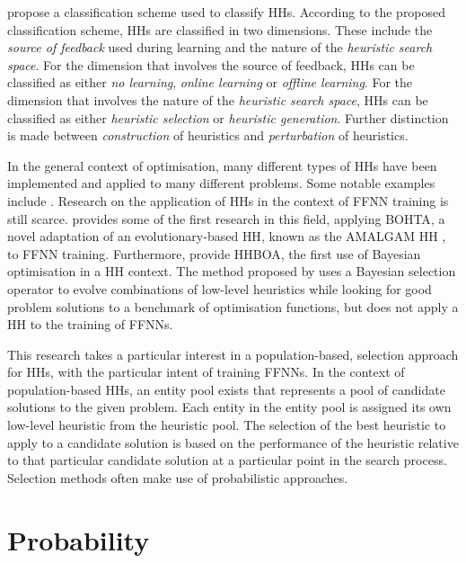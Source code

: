 \documentclass[preprint,review,12pt]{elsarticle}
\begin{document}
\citet{ref:burke:2010} propose a classification scheme used to classify \acp{HH}. According to the proposed classification scheme, \acp{HH} are classified in two dimensions. These include the \textit{source of feedback} used during learning and the nature of the \textit{heuristic search space}. For the dimension that involves the source of feedback, \acp{HH} can be classified as either \textit{no learning}, \textit{online learning} or \textit{offline learning}. For the dimension that involves the nature of the \textit{heuristic search space}, \acp{HH} can be classified as either \textit{heuristic selection} or \textit{heuristic generation}. Further distinction is made between \textit{construction} of heuristics and \textit{perturbation} of heuristics.

In the general context of optimisation, many different types of \acp{HH} have been implemented and applied to many different problems. Some notable examples include \citep{ref:burke:2010, ref:dowsland:2007, ref:grobler:2012, ref:vanderstockt:2018}. Research on the application of \acp{HH} in the context of \acs{FFNN} training is still scarce. \citet{ref:nel:2021} provides some of the first research in this field, applying \acs{BOHTA}, a novel adaptation of an evolutionary-based \acs{HH}, known as the \acs{AMALGAM} \acs{HH} \citep{ref:vrugt:2007}, to \acs{FFNN} training. Furthermore, \citet{ref:oliva:2019} provide \acs{HHBOA}, the first use of Bayesian optimisation in a \acs{HH} context. The method proposed by \citet{ref:oliva:2019} uses a Bayesian selection operator to evolve combinations of low-level heuristics  while looking for good problem solutions to a benchmark of optimisation functions, but does not apply a \acs{HH} to the training of \acp{FFNN}.

This research takes a particular interest in a population-based, selection approach for \acp{HH}, with the particular intent of training \acp{FFNN}. In the context of population-based \acp{HH}, an entity pool exists that represents a pool of candidate solutions to the given problem. Each entity in the entity pool is assigned its own low-level heuristic from the heuristic pool. The selection of the best heuristic to apply to a candidate solution is based on the performance of the heuristic relative to that particular candidate solution at a particular point in the search process. Selection methods often make use of probabilistic approaches.


\section{Probability}
\label{sec:probability}
\end{document}
